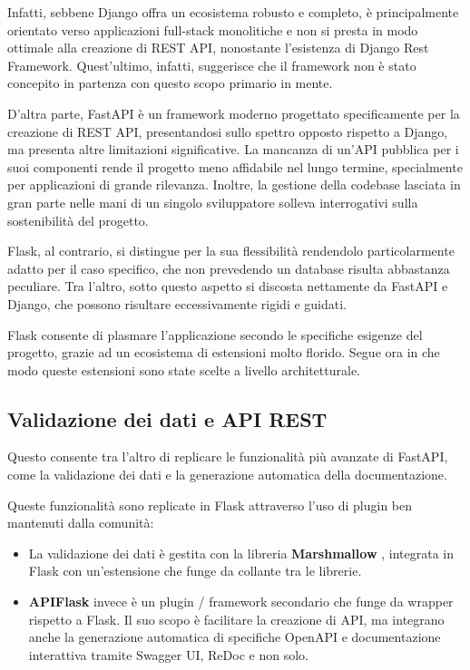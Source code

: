 Infatti, sebbene Django offra un ecosistema robusto e completo, è principalmente orientato verso applicazioni full-stack monolitiche e non si presta in modo ottimale alla creazione di REST API, nonostante l'esistenza di Django Rest Framework. Quest'ultimo, infatti, suggerisce che il framework non è stato concepito in partenza con questo scopo primario in mente.

D'altra parte, FastAPI è un framework moderno progettato specificamente per la creazione di REST API, presentandosi sullo spettro opposto rispetto a Django, ma presenta altre limitazioni significative. La mancanza di un'API pubblica per i suoi componenti rende il progetto meno affidabile nel lungo termine, specialmente per applicazioni di grande rilevanza. Inoltre, la gestione della codebase lasciata in gran parte nelle mani di un singolo sviluppatore solleva interrogativi sulla sostenibilità del progetto.

Flask, al contrario, si distingue per la sua flessibilità rendendolo particolarmente adatto per il caso specifico, che non prevedendo un database risulta abbastanza peculiare. Tra l'altro, sotto questo aspetto si discosta nettamente da FastAPI e Django, che possono risultare eccessivamente rigidi e guidati.

Flask consente di plasmare l'applicazione secondo le specifiche esigenze del progetto, grazie ad un ecosistema di estensioni molto florido. Segue ora in che modo queste estensioni sono state scelte a livello architetturale.

\subsection{Validazione dei dati e API REST}
Questo consente tra l'altro di replicare le funzionalità più avanzate di FastAPI, come la validazione dei dati e la generazione automatica della documentazione.

Queste funzionalità sono replicate in Flask attraverso l'uso di plugin ben mantenuti dalla comunità:
\begin{itemize}
    \item La validazione dei dati è gestita con la libreria \textbf{Marshmallow} \cite{marshmallow}, integrata in Flask con un'estensione che funge da collante tra le librerie.
    \item \textbf{APIFlask} \cite{apiflask} invece è un plugin / framework secondario che funge da wrapper rispetto a Flask. Il suo scopo è facilitare la creazione di API, ma integrano anche la generazione automatica di specifiche OpenAPI \cite{openapi-specification} e documentazione interattiva tramite Swagger UI, ReDoc e non solo.
\end{itemize}

